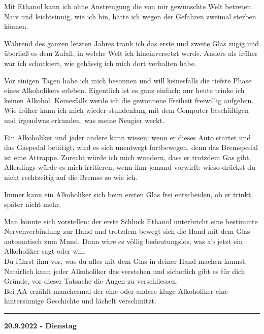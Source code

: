 \documentclass[10pt,a4paper]{article}
\newcommand\rele[1] {{\color {english} \bf {#1}}}         %
\newcommand\ddivide {\vskip -9pt \hrule \vskip 6pt}
\begin{document}
\begin{mdframed}[style=daystyle]
\vskip 4pt
Mit Ethanol kann ich ohne Anstrengung die von mir gewünschte Welt betreten. Naiv
und leichtsinnig, wie ich bin, hätte ich wegen der Gefahren zweimal sterben
können.

\vskip 4pt
Während des ganzen letzten Jahres trank ich das erste und zweite Glas zügig
und überließ es dem Zufall, in welche Welt ich hineinversetzt werde. Anders
als früher war ich schockiert, wie gehässig ich mich dort verhalten habe.

\vskip 4pt
Vor einigen Tagen habe ich mich besonnen und will keinesfalls die tiefste
Phase eines Alkoholikers erleben. Eigentlich ist es ganz einfach: nur heute
trinke ich keinen Alkohol. Keinesfalls werde ich die gewonnene Freiheit freiwillig
aufgeben. Wie früher kann ich mich wieder stundenlang mit dem Computer
beschäftigen und irgendwas erkunden, was meine Neugier weckt.

\vskip 4pt
Ein Alkoholiker und jeder andere kann wissen: wenn er dieses Auto startet und
das Gaspedal betätigt, wird es sich unentwegt fortbewegen, denn das Bremspedal
ist eine Attrappe. Zurecht würde ich mich wundern, dass er trotzdem Gas gibt.
Allerdings würde es mich irritieren, wenn ihm jemand vorwirft: wieso drückst
du nicht rechtzeitig auf die Bremse so wie ich.

\vskip 4pt
Immer kann ein Alkoholiker sich beim ersten Glas frei entscheiden, ob er trinkt,
später nicht mehr.

\vskip 4pt
Man könnte sich vorstellen: der erste Schluck Ethanol unterbricht eine bestimmte
Nervenverbindung zur Hand und trotzdem bewegt sich die Hand mit dem Glas
automatisch zum Mund. Dann wäre es völlig bedeutungslos, was ab jetzt ein
Alkoholiker sagt oder will. \\
Du führst ihm vor, was du alles mit dem Glas in deiner Hand machen kannst.
Natürlich kann jeder Alkoholiker das verstehen und sicherlich gibt es für dich
Gründe, vor dieser Tatsache die Augen zu verschliessen. \\
Bei AA erzählt manchesmal der eine oder andere kluge Alkoholiker eine hintersinnige
Geschichte und lächelt verschmitzt.
\end{mdframed}


\vskip 4pt
\ddivide
{\rele {20.9.2022 - Dienstag}}
       
\end{document}
